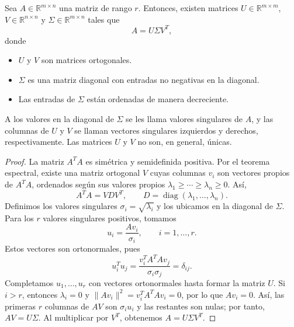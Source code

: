 \documentclass[a4,11pt]{aleph-notas}
\begin{document}
\encabezado

\begin{teo}
    Sea \(A \in \mathbb{R}^{m \times n}\) una matriz de rango \(r\). Entonces, existen matrices \(U \in \mathbb{R}^{m \times m}\), \(V \in \mathbb{R}^{n \times n}\) y \(\Sigma \in \mathbb{R}^{m \times n}\) tales que
    \[
        A = U \Sigma V^T,
    \]
    donde
    \begin{itemize}
        \item $U$ y $V$ son matrices ortogonales.
        \item $\Sigma$ es una matriz diagonal con entradas no negativas en la diagonal.
        \item Las entradas de $\Sigma$ están ordenadas de manera decreciente.
    \end{itemize}

    A los valores en la diagonal de \(\Sigma\) se les llama valores singulares de \(A\), y las columnas de \(U\) y \(V\) se llaman vectores singulares izquierdos y derechos, respectivamente.
    Las matrices \(U\) y \(V\) no son, en general, únicas.
\end{teo}

\begin{proof}
    La matriz \(A^T A\) es simétrica y semidefinida positiva. Por el teorema espectral, existe una matriz ortogonal \(V\) cuyas columnas \(v_i\) son vectores propios de \(A^T A\), ordenados según sus valores propios \(\lambda_1 \geq \cdots \geq \lambda_n \geq 0\). Así,
    \[
        A^T A = V D V^T, \qquad D = \operatorname{diag}(\lambda_1,\ldots,\lambda_n).
    \]
    Definimos los valores singulares \(\sigma_i=\sqrt{\lambda_i}\) y los ubicamos en la diagonal de \(\Sigma\). Para los \(r\) valores singulares positivos, tomamos
    \[
        u_i = \frac{A v_i}{\sigma_i}, \qquad i=1,\ldots,r.
    \]
    Estos vectores son ortonormales, pues
    \[
        u_i^T u_j = \frac{v_i^T A^T A v_j}{\sigma_i\sigma_j} = \delta_{ij}.
    \]
    Completamos \(u_1,\ldots,u_r\) con vectores ortonormales hasta formar la matriz \(U\). Si \(i>r\), entonces \(\lambda_i=0\) y \(\|Av_i\|^2=v_i^T A^T A v_i=0\), por lo que \(Av_i=0\). Así, las primeras \(r\) columnas de \(AV\) son \(\sigma_i u_i\) y las restantes son nulas; por tanto, \(AV=U\Sigma\). Al multiplicar por \(V^T\), obtenemos \(A=U\Sigma V^T\).
\end{proof}
    
\end{document}
